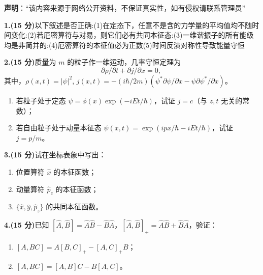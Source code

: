 
\textbf{声明}：“该内容来源于网络公开资料，不保证真实性，如有侵权请联系管理员”

\textbf{1.(15 分)}以下叙述是否正确:(1)在定态下，任意不是含的力学量的平均值均不随时间变化:(2)若厄密算符与对易，则它们必有共同本征态:(3)一维谐振子的所有能级均是非简并的:(4)厄密算符的本征值必为正数(5)时间反演对称性导致能量守恒

\textbf{2.(15 分)}质量为 $m$ 的粒子作一维运动，几率守恒定理为
\[
\partial \rho/\partial t + \partial j/\partial x = 0,~
\]
其中，$\rho(x,t) = |\psi|^2$, $j(x,t) = -(i\hbar/2m)(\psi^*\partial \psi/\partial x - \psi \partial \psi^*/\partial x)$。

\begin{enumerate}
    \item 若粒子处于定态 $\psi = \phi(x) \exp(-iEt/\hbar)$，试证 $j = c$（与 $z,t$ 无关的常数）；
    \item 若自由粒子处于动量本征态 $\psi(x,t) = \exp(ipx/\hbar - iEt/\hbar)$，试证 $j = p/m$。
\end{enumerate}

\textbf{3.(15 分)}试在坐标表象中写出：

\begin{enumerate}
    \item 位置算符 $\hat{x}$ 的本征函数；
    \item 动量算符 $\hat{p}_z$ 的本征函数；
    \item $\{\hat{x},\hat{y}, \hat{p}_z\}$ 的共同本征函数。
\end{enumerate}

\textbf{4.(15 分)}已知 $[\hat{A}, \hat{B}] = \hat{A}\hat{B} - \hat{B}\hat{A}$，$[\hat{A}, \hat{B}]_+ = \hat{A}\hat{B} + \hat{B}\hat{A}$，验证：

\begin{enumerate}
    \item $[A, BC] = A[B, C]_{+} - [A, C]_{+}B$；
    \item $[A, BC] = [A, B]C - B[A, C]$。
\end{enumerate}